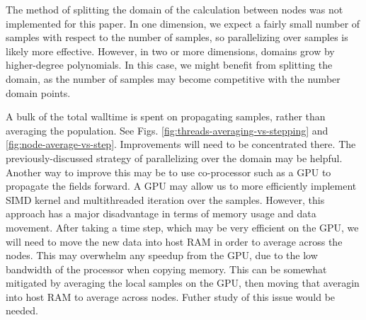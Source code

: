 \documentclass{article}
\begin{document}
The method of splitting the domain of the calculation between nodes was not implemented for this paper. 
In one dimension, we expect a fairly small number of samples with respect to the number of samples, 
so parallelizing over samples is likely more effective. However, in two or more dimensions, domains grow
by higher-degree polynomials. In this case, we might benefit from splitting the domain, as the number of 
samples may become competitive with the number domain points.

A bulk of the total walltime is spent on propagating samples, rather than averaging the population. See 
Figs. \ref{fig:threads-averaging-vs-stepping} and \ref{fig:node-average-vs-step}. Improvements will need 
to be concentrated there. The previously-discussed strategy of parallelizing over the domain may be helpful.
Another way to improve this may be to use co-processor such as a GPU to propagate the fields forward. 
A GPU may allow us to more efficiently implement SIMD kernel and multithreaded iteration over the samples.
However, this approach has a major disadvantage in terms of memory usage and data movement. 
After taking a time step, which may be very efficient on the GPU, we will need to move the new data
into host RAM in order to average across the nodes. This may overwhelm any speedup from the GPU, 
due to the low bandwidth of the processor when copying memory. This can be somewhat mitigated by 
averaging the local samples on the GPU, then moving that averagin into host RAM to average across nodes. 
Futher study of this issue would be needed.
\end{document}
